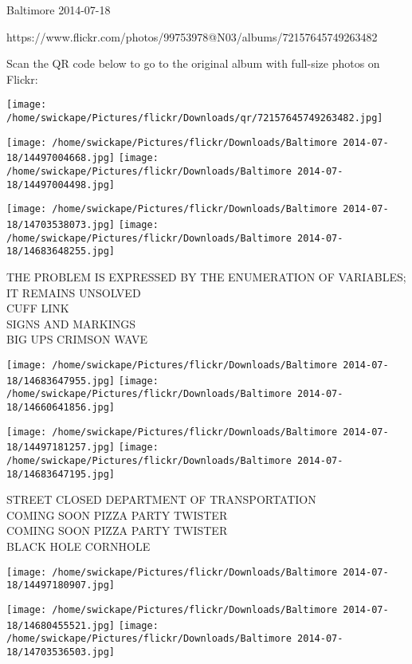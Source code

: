 \documentclass[10pt,letterpaper]{article}
\begin{document}
Baltimore 2014-07-18

https://www.flickr.com/photos/99753978@N03/albums/72157645749263482

Scan the QR code below to go to the original album with full-size photos on Flickr:

\texttt{[image: /home/swickape/Pictures/flickr/Downloads/qr/72157645749263482.jpg]}
\pagebreak

\texttt{[image: /home/swickape/Pictures/flickr/Downloads/Baltimore 2014-07-18/14497004668.jpg]}
\texttt{[image: /home/swickape/Pictures/flickr/Downloads/Baltimore 2014-07-18/14497004498.jpg]}

\texttt{[image: /home/swickape/Pictures/flickr/Downloads/Baltimore 2014-07-18/14703538073.jpg]}
\texttt{[image: /home/swickape/Pictures/flickr/Downloads/Baltimore 2014-07-18/14683648255.jpg]}

THE PROBLEM IS EXPRESSED BY THE ENUMERATION OF VARIABLES; IT REMAINS UNSOLVED\\
CUFF LINK\\
SIGNS AND MARKINGS\\
BIG UPS CRIMSON WAVE\\
\pagebreak

\texttt{[image: /home/swickape/Pictures/flickr/Downloads/Baltimore 2014-07-18/14683647955.jpg]}
\texttt{[image: /home/swickape/Pictures/flickr/Downloads/Baltimore 2014-07-18/14660641856.jpg]}

\texttt{[image: /home/swickape/Pictures/flickr/Downloads/Baltimore 2014-07-18/14497181257.jpg]}
\texttt{[image: /home/swickape/Pictures/flickr/Downloads/Baltimore 2014-07-18/14683647195.jpg]}

STREET CLOSED DEPARTMENT OF TRANSPORTATION\\
COMING SOON PIZZA PARTY TWISTER\\
COMING SOON PIZZA PARTY TWISTER\\
BLACK HOLE CORNHOLE\\
\pagebreak

\texttt{[image: /home/swickape/Pictures/flickr/Downloads/Baltimore 2014-07-18/14497180907.jpg]}

\vspace{0.25in}
\texttt{[image: /home/swickape/Pictures/flickr/Downloads/Baltimore 2014-07-18/14680455521.jpg]}
\texttt{[image: /home/swickape/Pictures/flickr/Downloads/Baltimore 2014-07-18/14703536503.jpg]}
\end{document}
